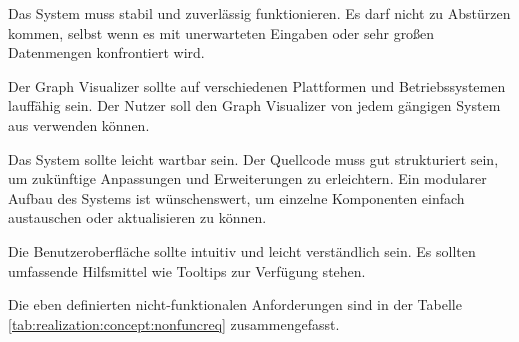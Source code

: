 Das System muss stabil und zuverlässig funktionieren. Es darf nicht zu Abstürzen kommen, selbst wenn es mit unerwarteten Eingaben oder sehr großen Datenmengen konfrontiert wird.

Der Graph Visualizer sollte auf verschiedenen Plattformen und Betriebssystemen lauffähig sein. Der Nutzer soll den Graph Visualizer von jedem gängigen System aus verwenden können.

Das System sollte leicht wartbar sein. Der Quellcode muss gut strukturiert sein, um zukünftige Anpassungen und Erweiterungen zu erleichtern. Ein modularer Aufbau des Systems ist wünschenswert, um einzelne Komponenten einfach austauschen oder aktualisieren zu können.

Die Benutzeroberfläche sollte intuitiv und leicht verständlich sein. Es sollten umfassende Hilfsmittel wie Tooltips zur Verfügung stehen.

Die eben definierten nicht-funktionalen Anforderungen sind in der Tabelle \ref{tab:realization:concept:nonfuncreq} zusammengefasst.

